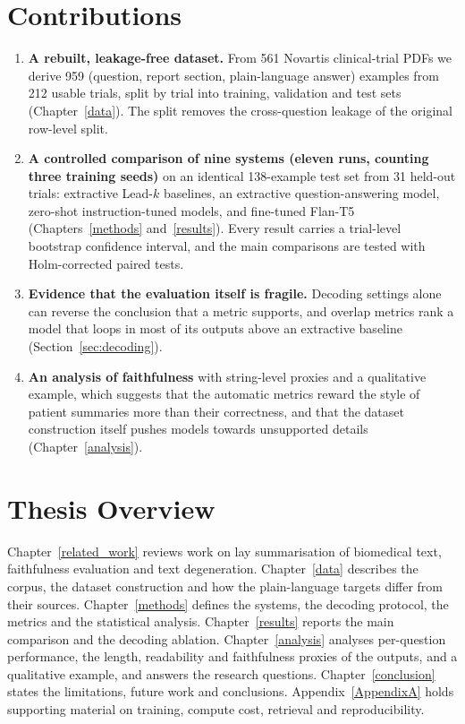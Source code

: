 \section{Contributions}

\begin{enumerate}
    \item \textbf{A rebuilt, leakage-free dataset.} From 561 Novartis clinical-trial PDFs we derive 959 (question, report section, plain-language answer) examples from 212 usable trials, split by trial into training, validation and test sets (Chapter~\ref{data}). The split removes the cross-question leakage of the original row-level split.
    \item \textbf{A controlled comparison of nine systems (eleven runs, counting three training seeds)} on an identical 138-example test set from 31 held-out trials: extractive Lead-$k$ baselines, an extractive question-answering model, zero-shot instruction-tuned models, and fine-tuned Flan-T5 (Chapters~\ref{methods} and~\ref{results}). Every result carries a trial-level bootstrap confidence interval, and the main comparisons are tested with Holm-corrected paired tests.
    \item \textbf{Evidence that the evaluation itself is fragile.} Decoding settings alone can reverse the conclusion that a metric supports, and overlap metrics rank a model that loops in most of its outputs above an extractive baseline (Section~\ref{sec:decoding}).
    \item \textbf{An analysis of faithfulness} with string-level proxies and a qualitative example, which suggests that the automatic metrics reward the style of patient summaries more than their correctness, and that the dataset construction itself pushes models towards unsupported details (Chapter~\ref{analysis}).
\end{enumerate}

\section{Thesis Overview}

Chapter~\ref{related_work} reviews work on lay summarisation of biomedical text, faithfulness evaluation and text degeneration. Chapter~\ref{data} describes the corpus, the dataset construction and how the plain-language targets differ from their sources. Chapter~\ref{methods} defines the systems, the decoding protocol, the metrics and the statistical analysis. Chapter~\ref{results} reports the main comparison and the decoding ablation. Chapter~\ref{analysis} analyses per-question performance, the length, readability and faithfulness proxies of the outputs, and a qualitative example, and answers the research questions. Chapter~\ref{conclusion} states the limitations, future work and conclusions. Appendix~\ref{AppendixA} holds supporting material on training, compute cost, retrieval and reproducibility.
